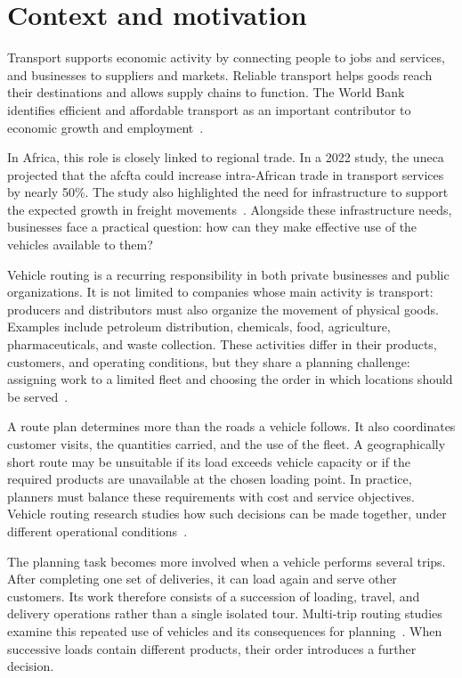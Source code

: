 \introduction

\section*{Context and motivation}

Transport supports economic activity by connecting people to jobs and
services, and businesses to suppliers and markets. Reliable transport helps
goods reach their destinations and allows supply chains to function.
The World Bank identifies efficient and affordable transport as an important
contributor to economic growth and employment~\cite{worldbankTransport}.

In Africa, this role is closely linked to regional trade. In a 2022 study,
the \gls{uneca} projected that the
\gls{afcfta} could increase intra-African trade in transport services by
nearly 50\%. The study also highlighted the need for infrastructure to
support the expected growth in freight movements~\cite{uneca2022transport}.
Alongside these infrastructure needs, businesses face a practical question:
how can they make effective use of the vehicles available to them?

Vehicle routing is a recurring responsibility in both private businesses
and public organizations. It is not limited to companies whose main activity
is transport: producers and distributors must also organize the movement of
physical goods. Examples include petroleum distribution, chemicals, food,
agriculture, pharmaceuticals, and waste collection. These activities differ
in their products, customers, and operating conditions, but they share a
planning challenge: assigning work to a limited fleet and choosing the order
in which locations should be served~\cite{toth2014vehicle,wen2010rich}.

A route plan determines more than the roads a vehicle follows. It also
coordinates customer visits, the quantities carried, and the use of the
fleet. A geographically short route may be unsuitable if its load exceeds
vehicle capacity or if the required products are unavailable at the chosen
loading point. In practice, planners must balance these requirements with
cost and service objectives. Vehicle routing research studies how such
decisions can be made together, under different operational
conditions~\cite{lahyani2015taxonomy}.

The planning task becomes more involved when a vehicle performs several
trips. After completing one set of deliveries, it can load again and serve
other customers. Its work therefore consists of a succession of loading,
travel, and delivery operations rather than a single isolated tour.
Multi-trip routing studies examine this repeated use of vehicles and its
consequences for planning~\cite{cattaruzza2016multipletrips}. When successive
loads contain different products, their order introduces a further decision.

